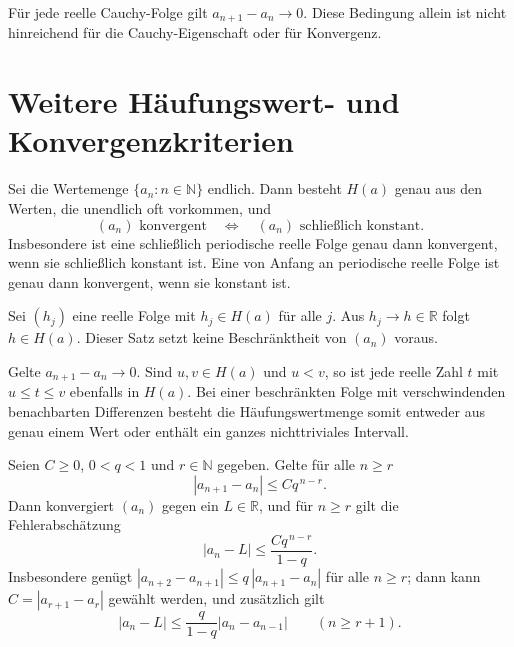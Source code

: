 \begin{theorem}
Für jede reelle Cauchy-Folge gilt
$a_{n+1}-a_n\to0$.
Diese Bedingung allein ist nicht hinreichend für die
Cauchy-Eigenschaft oder für Konvergenz.
\end{theorem}

\section{Weitere Häufungswert- und Konvergenzkriterien}

\begin{theorem}
\label{b21guide:thm:finite-range}
Sei die Wertemenge $\{a_n:n\in\mathbb N\}$ endlich.
Dann besteht $H(a)$ genau aus den Werten, die unendlich oft
vorkommen, und
\[
 (a_n)\text{ konvergent}
 \quad\Longleftrightarrow\quad
 (a_n)\text{ schließlich konstant}.
\]
Insbesondere ist eine schließlich periodische reelle Folge
genau dann konvergent, wenn sie schließlich konstant ist.
Eine von Anfang an periodische reelle Folge ist genau dann
konvergent, wenn sie konstant ist.
\end{theorem}

\begin{theorem}
\label{b21guide:thm:closed-cluster}
Sei $(h_j)$ eine reelle Folge mit $h_j\in H(a)$ für alle $j$.
Aus $h_j\to h\in\mathbb R$ folgt $h\in H(a)$.
Dieser Satz setzt keine Beschränktheit von $(a_n)$ voraus.
\end{theorem}

\begin{theorem}
\label{b21guide:thm:cluster-intermediate}
Gelte $a_{n+1}-a_n\to0$.
Sind $u,v\in H(a)$ und $u<v$, so ist jede reelle Zahl $t$
mit $u\leq t\leq v$ ebenfalls in $H(a)$.
Bei einer beschränkten Folge mit verschwindenden benachbarten
Differenzen besteht die Häufungswertmenge somit entweder aus
genau einem Wert oder enthält ein ganzes nichttriviales Intervall.
\end{theorem}

\begin{theorem}
\label{b21guide:thm:geometric-error}
Seien $C\geq0$, $0<q<1$ und $r\in\mathbb N$ gegeben.
Gelte für alle $n\geq r$
\[
 |a_{n+1}-a_n|\leq Cq^{\,n-r}.
\]
Dann konvergiert $(a_n)$ gegen ein $L\in\mathbb R$, und für
$n\geq r$ gilt die Fehlerabschätzung
\[
 |a_n-L|\leq\frac{Cq^{\,n-r}}{1-q}.
\]
Insbesondere genügt
$|a_{n+2}-a_{n+1}|\leq q\,|a_{n+1}-a_n|$ für alle $n\geq r$;
dann kann $C=|a_{r+1}-a_r|$ gewählt werden, und zusätzlich gilt
\[
 |a_n-L|\leq\frac{q}{1-q}|a_n-a_{n-1}|
 \qquad(n\geq r+1).
\]
\end{theorem}

